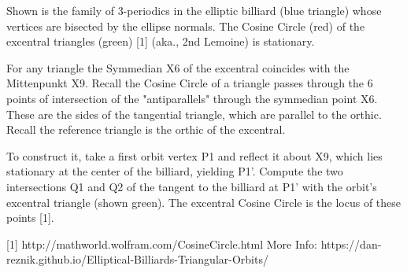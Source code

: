 Shown is the family of 3-periodics in the elliptic billiard (blue triangle) whose vertices are bisected by the ellipse normals. The Cosine Circle (red) of the excentral triangles (green) [1] (aka., 2nd Lemoine) is stationary.

For any triangle the Symmedian X6 of the excentral coincides with the Mittenpunkt X9. Recall the Cosine Circle of a triangle passes through the 6 points of intersection of the "antiparallels" through the symmedian point X6. These are the sides of the tangential triangle, which are parallel to the orthic. Recall the reference triangle is the orthic of the excentral.

To construct it, take a first orbit vertex P1 and reflect it about X9, which lies stationary at the center of the billiard, yielding P1'. Compute the two intersections Q1 and Q2 of the tangent to the billiard at P1' with the orbit's excentral triangle (shown green). The excentral Cosine Circle is the locus of these points [1].

[1] http://mathworld.wolfram.com/CosineCircle.html
More Info: https://dan-reznik.github.io/Elliptical-Billiards-Triangular-Orbits/